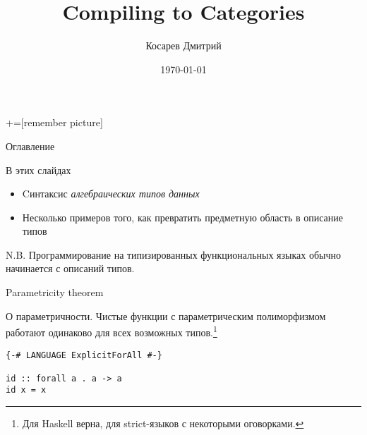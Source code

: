\documentclass[aspectratio=169
  , xcolor={svgnames}
  , hyperref={ colorlinks,citecolor=DeepPink4
             , linkcolor=DarkRed,urlcolor=DarkBlue}
  , russian
  ]{beamer}
\title[]{Compiling to Categories}
\author{Косарев Дмитрий }
\institute{матмех СПбГУ}
\date{\today}
\begin{document}
\maketitle

+=[remember picture] 

\everymath{\displaystyle}

\begin{frame}{Оглавление}
  \tableofcontents
\end{frame}

\begin{frame}{В этих слайдах}
\begin{itemize}
 \item Cинтаксис \emph{алгебраических типов данных}
 \item Несколько примеров того, как превратить предметную область в описание типов
\end{itemize}\vspace{1cm}


N.B. Программирование на типизированных функциональных языках обычно начинается с описаний типов.
\end{frame}




\begin{frame}[fragile]{Parametricity theorem~\cite{wadler}}
\begin{theorem}{О параметричности.}
Чистые функции с параметрическим полиморфизмом работают одинаково для всех возможных типов.\footnote{Для Haskell верна, для strict-языков с некоторыми оговорками.}
\end{theorem}\vspace{.5cm}


\begin{verbatim}
{-# LANGUAGE ExplicitForAll #-}

id :: forall a . a -> a
id x = x
\end{verbatim}
\end{frame}
\end{document}
